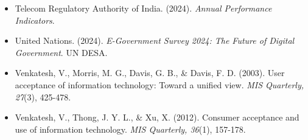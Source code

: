 \documentclass[11pt,a4paper]{article}
\begin{document}
\begin{itemize}[leftmargin=1.5em, itemindent=-1.5em, label={}]
\item Telecom Regulatory Authority of India. (2024). \textit{Annual Performance Indicators}. 

\item United Nations. (2024). \textit{E-Government Survey 2024: The Future of Digital Government}. UN DESA.

\item Venkatesh, V., Morris, M. G., Davis, G. B., \& Davis, F. D. (2003). User acceptance of information technology: Toward a unified view. \textit{MIS Quarterly, 27}(3), 425-478.

\item Venkatesh, V., Thong, J. Y. L., \& Xu, X. (2012). Consumer acceptance and use of information technology. \textit{MIS Quarterly, 36}(1), 157-178.
\end{itemize}
\end{document}

